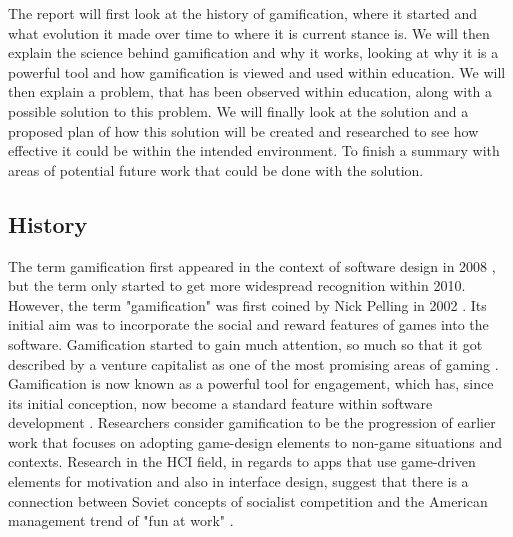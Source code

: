 \documentclass{sigchi}
\begin{document}
The report will first look at the history of gamification, where it started and what evolution it made over time to where it is current stance is. We will then explain the science behind gamification and why it works, looking at why it is a powerful tool and how gamification is viewed and used within education. We will then explain a problem, that has been observed within education, along with a possible solution to this problem. We will finally look at the solution and a proposed plan of how this solution will be created and researched to see how effective it could be within the intended environment. To finish a summary with areas of potential future work that could be done with the solution.

\subsection{History}

The term gamification first appeared in the context of software design in 2008 \cite{4}, but the term only started to get more widespread recognition within 2010. However, the term "gamification" was first coined by Nick Pelling in 2002 \cite{3e}. Its initial aim was to incorporate the social and reward features of games into the software. Gamification started to gain much attention, so much so that it got described by a venture capitalist as one of the most promising areas of gaming \cite{5}. Gamification is now known as a powerful tool for engagement, which has, since its initial conception, now become a standard feature within software development \cite{3e}. Researchers consider gamification to be the progression of earlier work that focuses on adopting game-design elements to non-game situations and contexts. Research in the HCI field, in regards to apps that use game-driven elements for motivation and also in interface design, suggest that there is a connection between Soviet concepts of socialist competition and the American management trend of "fun at work" \cite{5}.
\end{document}
